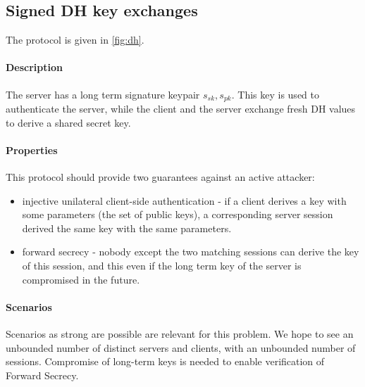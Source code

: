 \documentclass{article}
\newcommand{\sfsk}{\mathit{sk}}
\newcommand{\sfpk}{\mathit{pk}}
\begin{document}
\subsection{Signed DH key exchanges}\label{prob:dh}

The protocol is given in \cref{fig:dh}.

 \paragraph{Description} The server has a long term signature keypair $s_\sfsk,s_\sfpk$.
This key is used to authenticate the server, while the client and the server exchange fresh DH values to derive a shared secret key.

\paragraph{Properties} This protocol should provide two guarantees against an active attacker:
\begin{itemize}
\item injective unilateral client-side authentication - if a client derives a key with some parameters (the set of public keys), a corresponding server session derived the same key with the same parameters.
\item forward secrecy - nobody except the two matching sessions can derive the key of this session, and this even if the long term key of the server is compromised in the future.
\end{itemize}

\paragraph{Scenarios} Scenarios as strong are possible are relevant for this problem. We hope to see an unbounded number of distinct servers and clients, with an unbounded number of sessions. Compromise of long-term keys is needed to enable verification of Forward Secrecy.  
\end{document}

